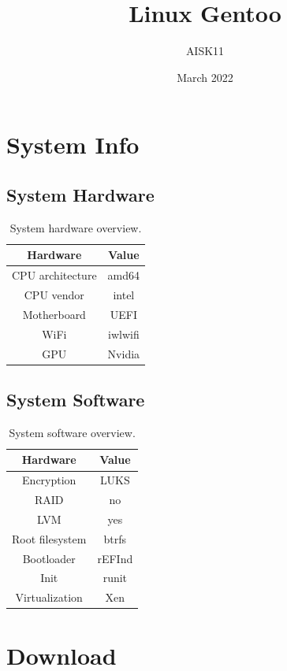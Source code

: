 \documentclass[10pt, a4paper, onecolumn, oneside, titlepage, openany]{book}
\title{\textbf{Linux Gentoo}}
\author{AISK11}
\date{March 2022}
\begin{document}
\maketitle
\tableofcontents


\chapter{System Info}
\section{System Hardware}
\begin{table}[h!]
\centering
\begin{tabular}{|c|c|}
    \hline
    \textbf{Hardware} & \textbf{Value} \\
    \hline
    CPU architecture & amd64\\
    CPU vendor & intel\\
    Motherboard & UEFI\\
    WiFi & iwlwifi\\
    GPU & Nvidia\\
    \hline
\end{tabular}
\caption{System hardware overview.}
\label{table:1}
\end{table}

\section{System Software}
\begin{table}[h!]
\centering
\begin{tabular}{|c|c|}
    \hline
    \textbf{Hardware} & \textbf{Value} \\
    \hline
    Encryption & LUKS\\
    RAID & no\\
    LVM & yes\\
    Root filesystem & btrfs\\
    Bootloader & rEFInd\\
    Init & runit\\
    Virtualization & Xen\\
    \hline
\end{tabular}
\caption{System software overview.}
\label{table:2}
\end{table}


\chapter{Download}
\end{document}
